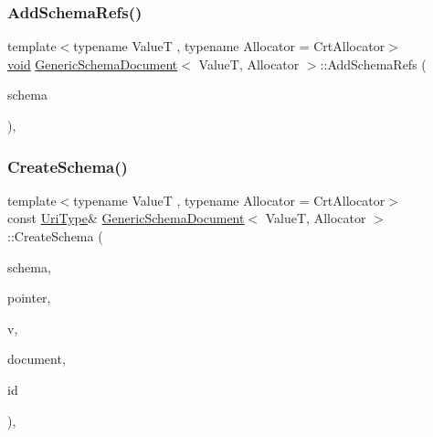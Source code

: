 \mbox{\label{classGenericSchemaDocument_a36fa45023cbd5caada24ea7fed87202a}} 
\subsubsection{\texorpdfstring{Add\+Schema\+Refs()}{AddSchemaRefs()}}
{\footnotesize\ttfamily template$<$typename ValueT , typename Allocator  = Crt\+Allocator$>$ \\
\hyperlink{imgui__impl__opengl3__loader_8h_ac668e7cffd9e2e9cfee428b9b2f34fa7}{void} \hyperlink{classGenericSchemaDocument}{Generic\+Schema\+Document}$<$ ValueT, Allocator $>$\+::Add\+Schema\+Refs (\begin{DoxyParamCaption}\item[{\hyperlink{classGenericSchemaDocument_acaf115202b159a2eb72c97c3dc6c3895}{Schema\+Type} $\ast$}]{schema }\end{DoxyParamCaption})\hspace{0.3cm}{\ttfamily [inline]}, {\ttfamily [private]}}

\mbox{\label{classGenericSchemaDocument_a8f191b70ab7706a6507e6bcb19102bee}} 
\subsubsection{\texorpdfstring{Create\+Schema()}{CreateSchema()}}
{\footnotesize\ttfamily template$<$typename ValueT , typename Allocator  = Crt\+Allocator$>$ \\
const \hyperlink{classGenericSchemaDocument_afcfefaab7eecec6849d478557392e23c}{Uri\+Type}\& \hyperlink{classGenericSchemaDocument}{Generic\+Schema\+Document}$<$ ValueT, Allocator $>$\+::Create\+Schema (\begin{DoxyParamCaption}\item[{const \hyperlink{classGenericSchemaDocument_acaf115202b159a2eb72c97c3dc6c3895}{Schema\+Type} $\ast$$\ast$}]{schema,  }\item[{const \hyperlink{classGenericSchemaDocument_aeb62f562d4dc024402b00f97cbcef747}{Pointer\+Type} \&}]{pointer,  }\item[{const \hyperlink{classGenericSchemaDocument_ae246f1b6573a5a8a2c0d73d4eb64d53a}{Value\+Type} \&}]{v,  }\item[{const \hyperlink{classGenericSchemaDocument_ae246f1b6573a5a8a2c0d73d4eb64d53a}{Value\+Type} \&}]{document,  }\item[{const \hyperlink{classGenericSchemaDocument_afcfefaab7eecec6849d478557392e23c}{Uri\+Type} \&}]{id }\end{DoxyParamCaption})\hspace{0.3cm}{\ttfamily [inline]}, {\ttfamily [private]}}

